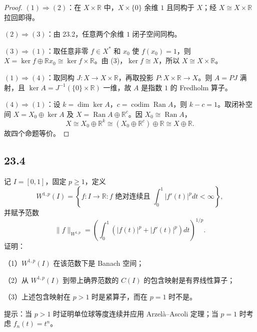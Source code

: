 \begin{proof}
$(1)\Rightarrow(2)$：在 $X\times\mathbb R$ 中，$X\times\{0\}$ 余维 $1$ 且同构于 $X$；经
$X\cong X\times\mathbb R$ 拉回即得。

$(2)\Rightarrow(3)$：由 23.2，任意两个余维 $1$ 闭子空间同构。

$(3)\Rightarrow(1)$：取任意非零 $f\in X^*$ 和 $x_0$ 使 $f(x_0)=1$，则
$X=\ker f\oplus\mathbb Rx_0\cong\ker f\times\mathbb R$。由 (3)，$\ker f\cong X$，所以
$X\cong X\times\mathbb R$。

$(1)\Rightarrow(4)$：取同构 $J:X\to X\times\mathbb R$，再取投影
$P:X\times\mathbb R\to X$。则 $A=PJ$ 满射，且 $\ker A=J^{-1}(\{0\}\times\mathbb R)$
一维，故 $A$ 是指数 $1$ 的 Fredholm 算子。

$(4)\Rightarrow(1)$：设 $k=\dim\ker A$，$c=\operatorname{codim}\operatorname{Ran}A$，则
$k-c=1$。取闭补空间 $X=X_0\oplus\ker A$ 及
$X=\operatorname{Ran}A\oplus\mathbb R^c$。因 $X_0\cong\operatorname{Ran}A$，
\[
 X\cong X_0\oplus\mathbb R^k
   \cong(X_0\oplus\mathbb R^c)\oplus\mathbb R
   \cong X\oplus\mathbb R.
\]
故四个命题等价。
\end{proof}

\subsection*{23.4}
\begin{problem}
记 $I=[0,1]$，固定 $p\geq1$，定义
\[
 W^{1,p}(I)=\left\{f:I\to\mathbb R: f\text{ 绝对连续且 }
 \int_0^1|f'(t)|^pdt<\infty\right\},
\]
并赋予范数
\[
 \|f\|_{W^{1,p}}=\left(\int_0^1(|f(t)|^p+|f'(t)|^p)dt\right)^{1/p}.
\]
证明：

（1）$W^{1,p}(I)$ 在该范数下是 Banach 空间；

（2）从 $W^{1,p}(I)$ 到带上确界范数的 $C(I)$ 的包含映射是有界线性算子；

（3）上述包含映射在 $p>1$ 时是紧算子，而在 $p=1$ 时不是。

提示：当 $p>1$ 时证明单位球等度连续并应用 Arzelà--Ascoli 定理；当 $p=1$ 时考虑
$f_n(t)=t^n$。
\end{problem}

